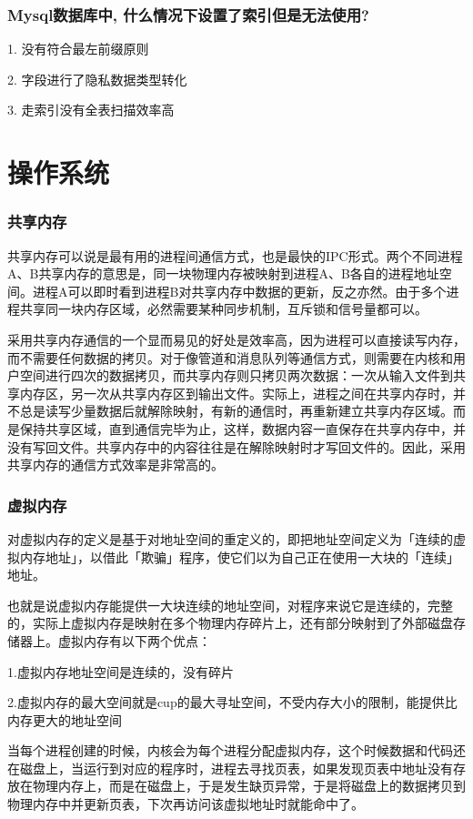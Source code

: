 \documentclass[UTF8]{ctexart}
\begin{document}
\subsubsection{Mysql数据库中, 什么情况下设置了索引但是无法使用?}
1. 没有符合最左前缀原则 \par
2. 字段进行了隐私数据类型转化 \par
3. 走索引没有全表扫描效率高
\section{操作系统}

\subsubsection{共享内存}
共享内存可以说是最有用的进程间通信方式，也是最快的IPC形式。两个不同进程A、B共享内存的意思是，同一块物理内存被映射到进程A、B各自的进程地址空间。进程A可以即时看到进程B对共享内存中数据的更新，反之亦然。由于多个进程共享同一块内存区域，必然需要某种同步机制，互斥锁和信号量都可以。

采用共享内存通信的一个显而易见的好处是效率高，因为进程可以直接读写内存，而不需要任何数据的拷贝。对于像管道和消息队列等通信方式，则需要在内核和用户空间进行四次的数据拷贝，而共享内存则只拷贝两次数据：一次从输入文件到共享内存区，另一次从共享内存区到输出文件。实际上，进程之间在共享内存时，并不总是读写少量数据后就解除映射，有新的通信时，再重新建立共享内存区域。而是保持共享区域，直到通信完毕为止，这样，数据内容一直保存在共享内存中，并没有写回文件。共享内存中的内容往往是在解除映射时才写回文件的。因此，采用共享内存的通信方式效率是非常高的。

\subsubsection{虚拟内存}
对虚拟内存的定义是基于对地址空间的重定义的，即把地址空间定义为「连续的虚拟内存地址」，以借此「欺骗」程序，使它们以为自己正在使用一大块的「连续」地址。

也就是说虚拟内存能提供一大块连续的地址空间，对程序来说它是连续的，完整的，实际上虚拟内存是映射在多个物理内存碎片上，还有部分映射到了外部磁盘存储器上。虚拟内存有以下两个优点：

1.虚拟内存地址空间是连续的，没有碎片

2.虚拟内存的最大空间就是cup的最大寻址空间，不受内存大小的限制，能提供比内存更大的地址空间

当每个进程创建的时候，内核会为每个进程分配虚拟内存，这个时候数据和代码还在磁盘上，当运行到对应的程序时，进程去寻找页表，如果发现页表中地址没有存放在物理内存上，而是在磁盘上，于是发生缺页异常，于是将磁盘上的数据拷贝到物理内存中并更新页表，下次再访问该虚拟地址时就能命中了。
\end{document}
